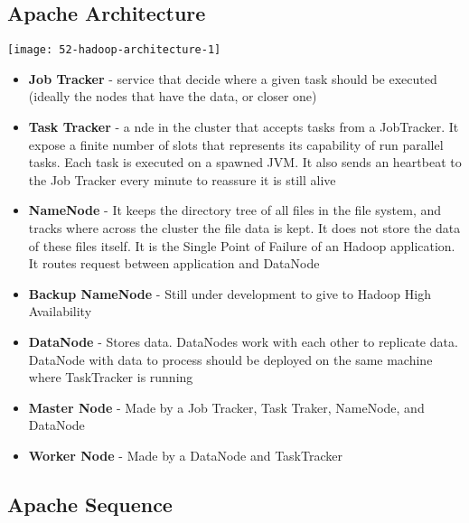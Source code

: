 \subsection{Apache Architecture}

\begin{center}
\texttt{[image: 52-hadoop-architecture-1]}
\end{center}

\begin{itemize}
	\item \textbf{Job Tracker}
	- service that decide where a given task should be executed (ideally the nodes that have the data, or closer one)
	\item \textbf{Task Tracker}
	- a nde in the cluster that accepts tasks from a JobTracker. It expose a finite number of slots that represents its capability of run parallel tasks. Each task is executed on a spawned JVM. It also sends an heartbeat to the Job Tracker every minute to reassure it is still alive
\end{itemize}

\begin{itemize}
	\item \textbf{NameNode}
	- It keeps the directory tree of all files in the file system, and tracks where across the cluster the file data is kept. It does not store the data of these files itself. It is the Single Point of Failure of an Hadoop application. It routes request between application and DataNode
	\item \textbf{Backup NameNode}
	- Still under development to give to Hadoop High Availability
	\item \textbf{DataNode}
	- Stores data. DataNodes work with each other to replicate data. DataNode with data to process should be deployed on the same machine where TaskTracker is running
\end{itemize}

\begin{itemize}
	\item \textbf{Master Node}
	- Made by a Job Tracker, Task Traker, NameNode, and DataNode
	\item \textbf{Worker Node}
	- Made by a DataNode and TaskTracker
\end{itemize}


\subsection{Apache Sequence}

